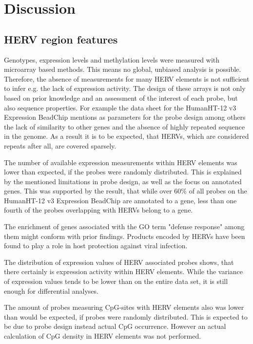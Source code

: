 \documentclass[a4paper,12pt,twoside,openright]{report}
\begin{document}
\newpage
\chapter{Discussion}
\label{Discussion}

\section{HERV region features}
\label{Discussion:HERV region features}

Genotypes, expression levels and methylation levels were measured with microarray based methods. This means no global, unbiased analysis is possible. Therefore, the absence of measurements for many HERV elements is not sufficient to infer e.g. the lack of expression activity. The design of these arrays is not only based on prior knowledge and an assessment of the interest of each probe, but also sequence properties. For example the data sheet for the HumanHT-12 v3 Expression BeadChip\cite{HumanHT} mentions as parameters for the probe design among others the lack of similarity to other genes and the absence of highly repeated sequence in the genome. As a result it is to be expected, that HERVs, which are considered repeats after all, are covered sparsely. 

The number of available expression measurements within HERV elements was lower than expected, if the probes were randomly distributed. This is explained by the mentioned limitations in probe design, as well as the focus on annotated genes. This was supported by the result, that while over 60\% of all probes on the HumanHT-12 v3 Expression BeadChip are annotated to a gene, less than one fourth of the probes overlapping with HERVs belong to a gene.

The enrichment of genes associated with the GO term "defense response" among them might conform with prior findings. Products encoded by HERVs have been found to play a role in host protection against viral infection\cite{Malfavon-Borja2015}.

The distribution of expression values of HERV associated probes shows, that there certainly is expression activity within HERV elements. While the variance of expression values tends to be lower than on the entire data set, it is still enough for differential analyses. 

The amount of probes measuring CpG-sites with HERV elements also was lower than would be expected, if probes were randomly distributed. This is expected to be due to probe design instead actual CpG occurrence. However an actual calculation of CpG density in HERV elements was not performed. 
\end{document}
